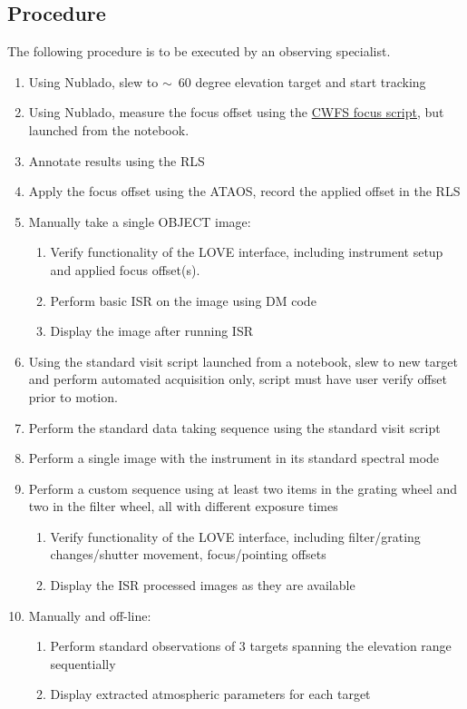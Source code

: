 \subsection{Procedure}
The following procedure is to be executed by an observing specialist.
\begin{enumerate}
	\item Using Nublado, slew to $\sim$~60 degree elevation target and start tracking
	\item Using Nublado, measure the focus offset using the \href{https://github.com/lsst-ts/ts_externalscripts/blob/develop/python/lsst/ts/externalscripts/auxtel/latiss_cwfs_align.py}{CWFS focus script}, but launched from the notebook.
	\item Annotate results using the \gls{RLS}
	\item Apply the focus offset using the ATAOS, record the applied offset in the \gls{RLS}
	\item Manually take a single OBJECT image:
	\begin{enumerate}
		\item Verify functionality of the \gls{LOVE} interface, including instrument setup and applied focus offset(s).
		\item Perform basic \gls{ISR} on the image using DM code
		\item Display the image after running \gls{ISR}
	\end{enumerate}	
	\item Using the standard visit script launched from a notebook, slew to new target and perform automated acquisition only, script must have user verify offset prior to motion.
	\item Perform the standard data taking sequence using the standard visit script
	\item Perform a single image with the instrument in its standard spectral mode
	\item Perform a custom sequence using at least two items in the grating wheel and two in the filter wheel, all with different exposure times
	\begin{enumerate}
		\item Verify functionality of the \gls{LOVE} interface, including filter/grating changes/shutter movement, focus/pointing offsets
		\item Display the \gls{ISR} processed images as they are available
	\end{enumerate}	
	\item Manually and off-line:
		\begin{enumerate}
			\item Perform standard observations of 3 targets spanning the elevation range sequentially			\item Display extracted atmospheric parameters for each target %
		\end{enumerate}
\end{enumerate}
